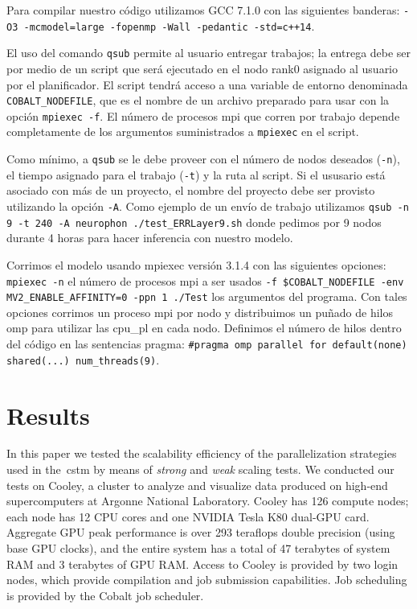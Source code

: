 {Para compilar nuestro código utilizamos GCC 7.1.0 con las siguientes banderas: \texttt{-O3 -mcmodel=large -fopenmp -Wall -pedantic -std=c++14}.

El uso del comando \texttt{qsub} permite al usuario entregar trabajos; la entrega debe ser por medio de un script que será ejecutado en el nodo rank0 asignado al usuario por el planificador.
El script tendrá acceso a una variable de entorno denominada \texttt{COBALT\_NODEFILE}, que es el nombre de un archivo preparado para usar con la opción \texttt{mpiexec -f}. 
El número de procesos \gls{mpi} que corren por trabajo depende completamente de los argumentos suministrados a \texttt{mpiexec} en el script.

Como mínimo, a \texttt{qsub} se le debe proveer con el número de nodos deseados (\texttt{-n}), el tiempo asignado para el trabajo (\texttt{-t}) y la ruta al script.
Si el ususario está asociado con más de un proyecto, el nombre del proyecto debe ser provisto utilizando la opción \texttt{-A}.
Como ejemplo de un envío de trabajo utilizamos \texttt{qsub -n 9 -t 240 -A neurophon ./test\_ERRLayer9.sh} donde pedimos por 9 nodos durante 4 horas para hacer inferencia con nuestro modelo.

Corrimos el modelo usando mpiexec versión 3.1.4 con las siguientes opciones: \texttt{mpiexec -n} el número de procesos \gls{mpi} a ser usados \texttt{-f \$COBALT\_NODEFILE -env MV2\_ENABLE\_AFFINITY=0 -ppn 1 ./Test} los argumentos del programa.
Con tales opciones corrimos un proceso \gls{mpi} por nodo y distribuimos un puñado de hilos \gls{omp} para utilizar las \gls{cpu_pl} en cada nodo.
Definimos el número de hilos dentro del código en las sentencias pragma: \texttt{\#pragma omp parallel for default(none) shared(...) num\_threads(9)}.
}{
\section{Results}

In this paper we tested the scalability efficiency of the parallelization strategies used in the~\gls{cstm} by means of \emph{strong} and \emph{weak} scaling tests. We conducted our tests on Cooley, a cluster to analyze and visualize data produced on high-end supercomputers at Argonne National Laboratory. Cooley has 126 compute nodes; each node has 12 CPU cores and one NVIDIA Tesla K80 dual-GPU card. Aggregate GPU peak performance is over 293 teraflops double precision (using base GPU clocks), and the entire system has a total of 47 terabytes of system RAM and 3 terabytes of GPU RAM. Access to Cooley is provided by two login nodes, which provide compilation and job submission capabilities. Job scheduling is provided by the Cobalt job scheduler.

}
